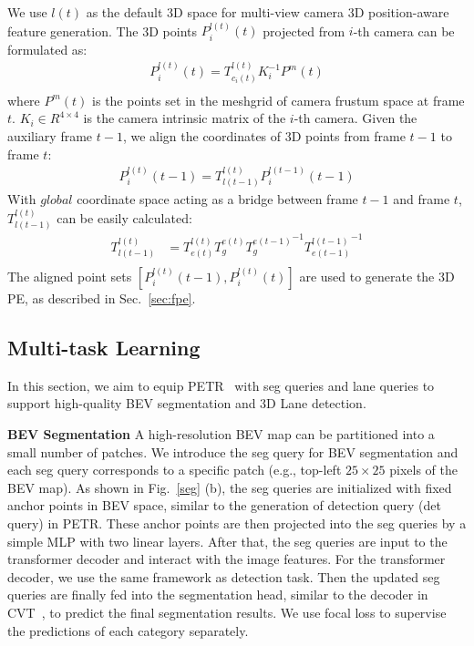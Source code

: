 \documentclass[10pt,twocolumn,letterpaper]{article}
\begin{document}
We use $l(t)$ as the default 3D space for multi-view camera 3D position-aware feature generation. The 3D points $P^{l(t)}_i(t)$ projected from $i$-th camera can be formulated as:
\begin{equation}
\begin{split}
    P^{l(t)}_i(t) = T^{l(t)}_{c_i(t)} K^{-1}_{i} P^{m}(t) \\
\end{split}
\end{equation}
where $P^{m}(t)$ is the points set in the meshgrid of camera frustum space at frame $t$. $K_i\in R^{4 \times 4}$ is the camera intrinsic matrix of the $i$-th camera.
Given the auxiliary frame $t-1$, we align the coordinates of 3D points from frame $t-1$ to frame $t$:
\begin{equation}
\begin{split}
    P^{l(t)}_i(t-1) = T^{l(t)}_{l(t-1)} P^{l(t-1)}_i(t-1) 
\end{split}
\end{equation}
With $global$ coordinate space acting as a bridge between frame $t-1$ and frame $t$, $T^{l(t)}_{l(t-1)}$ can be easily calculated:
\begin{equation}
    \begin{split}
T^{l(t)}_{l(t-1)} &= T^{l(t)}_{e(t)} T^{e(t)}_{g} {T^{e(t-1)}_{g}}^{-1} {T^{l(t-1)}_{e(t-1)}}^{-1} \\
    \end{split}
\end{equation}
The aligned point sets $[P^{l(t)}_i(t-1), P^{l(t)}_i(t)]$ are used to generate the 3D PE, as described in Sec.~\ref{sec:fpe}. 

\subsection{Multi-task Learning}
In this section, we aim to equip PETR~\cite{liu2022petr} with seg queries and lane queries to support high-quality BEV segmentation and 3D Lane detection.


\noindent \textbf{BEV Segmentation} 
A high-resolution BEV map can be partitioned into a small number of patches. 
We introduce the seg query for BEV segmentation and each seg query corresponds to a specific patch (e.g., top-left $25 \times 25$ pixels of the BEV map). As shown in Fig.~\ref{seg} (b), the seg queries are initialized with fixed anchor points in BEV space, similar to the generation of detection query (det query) in PETR. These anchor points are then projected into the seg queries by a simple MLP with two linear layers. After that, the seg queries are input to the transformer decoder and interact with the image features. For the transformer decoder, we use the same framework as detection task. Then the updated seg queries are finally fed into the segmentation head, similar to the decoder in CVT~\cite{zhou2022cross}, to predict the final segmentation results. We use focal loss to supervise the predictions of each category separately.
\end{document}
